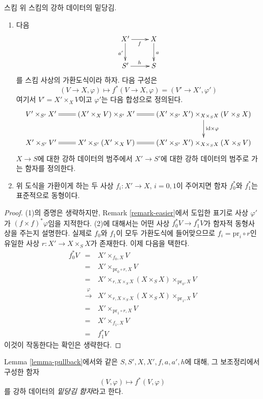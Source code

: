 \begin{lemma}
\label{lemma-pullback}
스킴 위 스킴의 강하 데이터의 밑당김.
\begin{enumerate}
\item 다음
$$
\xymatrix{
X' \ar[r]_f \ar[d]_{a'} & X \ar[d]^a \\
S' \ar[r]^h & S
}
$$
를 스킴 사상의 가환도식이라 하자. 다음 구성은
$$
(V \to X, \varphi) \longmapsto f^*(V \to X, \varphi) = (V' \to X', \varphi')
$$
여기서 $V' = X' \times_X V$이고 $\varphi'$는 다음 합성으로 정의된다.
$$
\xymatrix{
V' \times_{S'} X' \ar@{=}[r] &
(X' \times_X V) \times_{S'} X' \ar@{=}[r] &
(X' \times_{S'} X') \times_{X \times_S X} (V \times_S X)
\ar[d]^{\text{id} \times \varphi} \\
X' \times_{S'} V' \ar@{=}[r] &
X' \times_{S'} (X' \times_X V) &
(X' \times_{S'} X') \times_{X \times_S X} (X \times_S V) \ar@{=}[l]
}
$$
$X \to S$에 대한 강하 데이터의 범주에서 $X' \to S'$에 대한 강하
데이터의 범주로 가는 함자를 정의한다.
\item 위 도식을 가환이게 하는 두 사상 $f_i : X' \to X$,
$i = 0, 1$이 주어지면 함자 $f_0^*$와 $f_1^*$는 표준적으로 동형이다.
\end{enumerate}
\end{lemma}

\begin{proof}
(1)의 증명은 생략하지만, Remark \ref{remark-easier}에서 도입한 표기로
사상 $\varphi'$가 $(f \times f)^*\varphi$임을 지적한다. (2)에 대해서는
어떤 사상 $f_0^*V \to f_1^*V$가 함자적 동형사상을 주는지 설명한다.
실제로 $f_0$와 $f_1$이 모두 가환도식에 들어맞으므로
$f_i = \text{pr}_i \circ r$인 유일한 사상
$r : X' \to X \times_S X$가 존재한다. 이제 다음을 택한다.
\begin{eqnarray*}
f_0^*V & = &
X' \times_{f_0, X} V \\
& = &
X' \times_{\text{pr}_0 \circ r, X} V \\
& = &
X' \times_{r, X \times_S X} (X \times_S X) \times_{\text{pr}_0, X} V \\
& \xrightarrow{\varphi} &
X' \times_{r, X \times_S X} (X \times_S X) \times_{\text{pr}_1, X} V \\
& = &
X' \times_{\text{pr}_1 \circ r, X} V \\
& = &
X' \times_{f_1, X} V \\
& = & f_1^*V
\end{eqnarray*}
이것이 작동한다는 확인은 생략한다.
\end{proof}

\begin{definition}
\label{definition-pullback-functor}
Lemma \ref{lemma-pullback}에서와 같은 $S, S', X, X', f, a, a', h$에
대해, 그 보조정리에서 구성한 함자
$$
(V, \varphi) \longmapsto f^*(V, \varphi)
$$
를 강하 데이터의 {\it 밑당김 함자}라고 한다.
\end{definition}

